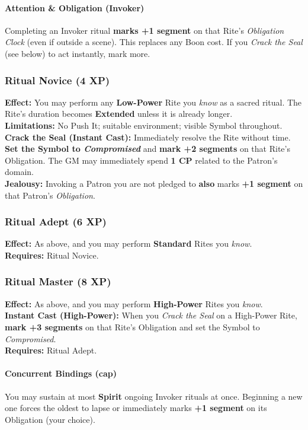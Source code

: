 \documentclass[12pt,twoside]{book}
\begin{document}
\paragraph{Attention \& Obligation (Invoker)}
Completing an Invoker ritual \textbf{marks +1 segment} on that Rite's \emph{Obligation Clock} (even if outside a scene). This replaces any Boon cost. If you \emph{Crack the Seal} (see below) to act instantly, mark more.

\subsubsection*{Ritual Novice (4 XP)}
\textbf{Effect:} You may perform any \textbf{Low-Power} Rite you \emph{know} as a sacred ritual. The Rite's duration becomes \textbf{Extended} unless it is already longer.\\
\textbf{Limitations:} No Push It; suitable environment; visible Symbol throughout.\\
\textbf{Crack the Seal (Instant Cast):} Immediately resolve the Rite without time. \textbf{Set the Symbol to \emph{Compromised}} and \textbf{mark +2 segments} on that Rite's Obligation. The GM may immediately spend \textbf{1 CP} related to the Patron's domain.\\
\textbf{Jealousy:} Invoking a Patron you are not pledged to \textbf{also} marks \textbf{+1 segment} on that Patron's \emph{Obligation}.

\subsubsection*{Ritual Adept (6 XP)} 
\textbf{Effect:} As above, and you may perform \textbf{Standard} Rites you \emph{know}.\\
\textbf{Requires:} Ritual Novice.

\subsubsection*{Ritual Master (8 XP)} 
\textbf{Effect:} As above, and you may perform \textbf{High-Power} Rites you \emph{know}.\\
\textbf{Instant Cast (High-Power):} When you \emph{Crack the Seal} on a High-Power Rite, \textbf{mark +3 segments} on that Rite's Obligation and set the Symbol to \emph{Compromised}.\\
\textbf{Requires:} Ritual Adept.

\paragraph{Concurrent Bindings (cap)}
You may sustain at most \textbf{Spirit} ongoing Invoker rituals at once. Beginning a new one forces the oldest to lapse or immediately marks \textbf{+1 segment} on its Obligation (your choice).
\end{document}

